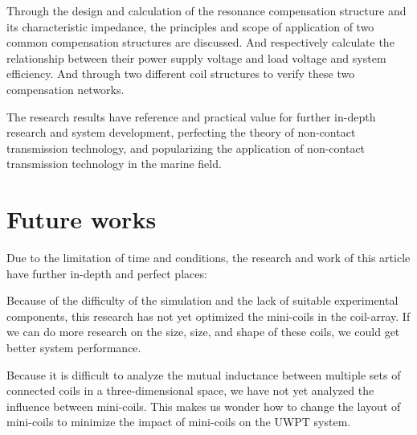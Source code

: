 Through the design and calculation of the resonance compensation structure and its characteristic impedance, the principles and scope of application of two common compensation structures are discussed.
And respectively calculate the relationship between their power supply voltage and load voltage and system efficiency.
And through two different coil structures to verify these two compensation networks.

The research results have reference and practical value for further in-depth research and system development, perfecting the theory of non-contact transmission technology, and popularizing the application of non-contact transmission technology in the marine field.

\section{Future works}
Due to the limitation of time and conditions, the research and work of this article have further in-depth and perfect places:

Because of the difficulty of the simulation and the lack of suitable experimental components, this research has not yet optimized the mini-coils in the coil-array. If we can do more research on the size, size, and shape of these coils, we could get better system performance.

Because it is difficult to analyze the mutual inductance between multiple sets of connected coils in a three-dimensional space, we have not yet analyzed the influence between mini-coils.
This makes us wonder how to change the layout of mini-coils to minimize the impact of mini-coils on the UWPT system.



